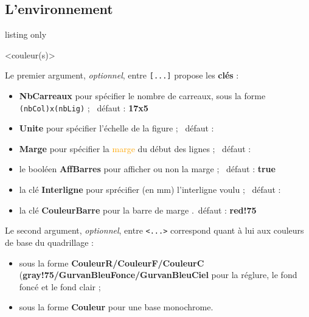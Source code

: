 \documentclass[a4paper]{article}
\newcommand\Cle[1]{{\bfseries\sffamily\textlangle #1\textrangle}}
\begin{document}
\subsection{L'environnement}

\begin{PresentationCode}{listing only}

\begin{EnvGurvan}[clés]<couleur(s)>
\end{EnvGurvan}
\end{PresentationCode}

Le premier argument, \textit{optionnel}, entre \texttt{[...]} propose les \Cle{clés} :

\begin{itemize}
	\item \Cle{NbCarreaux} pour spécifier le nombre de carreaux, sous la forme \texttt{(nbCol)x(nbLig)} ; \hfill~défaut : \Cle{17x5}
	\item \Cle{Unite} pour spécifier l'échelle de la figure ; \hfill~défaut : \Cle{1}
	\item \Cle{Marge} pour spécifier la \textcolor{orange}{marge} du début des lignes ; \hfill~défaut : \Cle{4}
	\item le booléen \Cle{AffBarres} pour afficher ou non la marge ; \hfill~défaut : \Cle{true}
	\item la clé \Cle{Interligne} pour sprécifier (en mm) l'interligne voulu ; \hfill~défaut : \Cle{3}
	\item la clé \Cle{CouleurBarre} pour la barre de marge .\hfill~défaut : \Cle{red!75}
\end{itemize}

Le second argument, \textit{optionnel}, entre \texttt{<...>} correspond quant à lui aux couleurs de base du quadrillage :

\begin{itemize}
	\item sous la forme \Cle{CouleurR/CouleurF/CouleurC} (\Cle{gray!75/GurvanBleuFonce/GurvanBleuCiel} pour la réglure, le fond foncé et le fond clair ;
	\item sous la forme \Cle{Couleur} pour une base monochrome.
\end{itemize}
\end{document}
